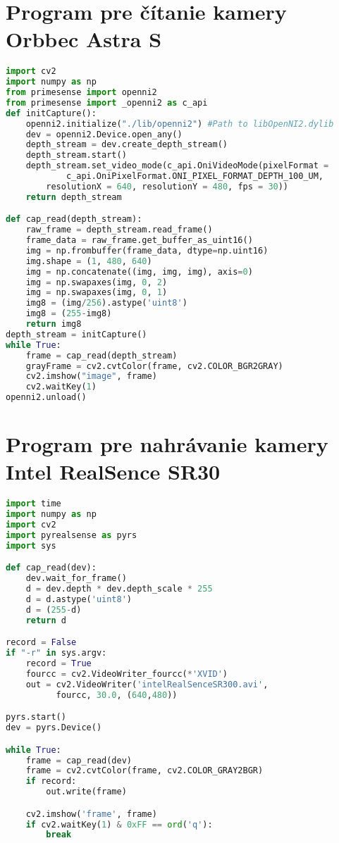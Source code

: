 
\chapter{Program pre čítanie kamery Orbbec Astra S}
\label{pr:astra}
\begin{lstlisting}[language=Python]
import cv2
import numpy as np
from primesense import openni2
from primesense import _openni2 as c_api
def initCapture():
    openni2.initialize("./lib/openni2") #Path to libOpenNI2.dylib
    dev = openni2.Device.open_any()
    depth_stream = dev.create_depth_stream()
    depth_stream.start()
    depth_stream.set_video_mode(c_api.OniVideoMode(pixelFormat = 
            c_api.OniPixelFormat.ONI_PIXEL_FORMAT_DEPTH_100_UM,
        resolutionX = 640, resolutionY = 480, fps = 30))
    return depth_stream

def cap_read(depth_stream):
    raw_frame = depth_stream.read_frame()
    frame_data = raw_frame.get_buffer_as_uint16()
    img = np.frombuffer(frame_data, dtype=np.uint16)
    img.shape = (1, 480, 640)
    img = np.concatenate((img, img, img), axis=0)
    img = np.swapaxes(img, 0, 2)
    img = np.swapaxes(img, 0, 1)
    img8 = (img/256).astype('uint8')
    img8 = (255-img8)
    return img8
depth_stream = initCapture()
while True:
    frame = cap_read(depth_stream)
    grayFrame = cv2.cvtColor(frame, cv2.COLOR_BGR2GRAY)
    cv2.imshow("image", frame)
    cv2.waitKey(1)
openni2.unload()

\end{lstlisting}

\chapter{Program pre nahrávanie kamery Intel RealSence SR30}
\label{pr:realSence}
\begin{lstlisting}[language=Python]
import time
import numpy as np
import cv2
import pyrealsense as pyrs
import sys

def cap_read(dev):
    dev.wait_for_frame()
    d = dev.depth * dev.depth_scale * 255
    d = d.astype('uint8')
    d = (255-d)
    return d

record = False
if "-r" in sys.argv:
    record = True
    fourcc = cv2.VideoWriter_fourcc(*'XVID')
    out = cv2.VideoWriter('intelRealSenceSR300.avi',
          fourcc, 30.0, (640,480))

pyrs.start()
dev = pyrs.Device()

while True:
    frame = cap_read(dev)
    frame = cv2.cvtColor(frame, cv2.COLOR_GRAY2BGR)
    if record:
        out.write(frame)

    cv2.imshow('frame', frame)
    if cv2.waitKey(1) & 0xFF == ord('q'):
        break
\end{lstlisting}


